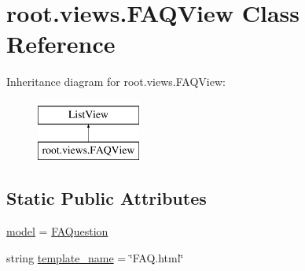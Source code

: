 \hypertarget{classroot_1_1views_1_1_f_a_q_view}{\section{root.\-views.\-F\-A\-Q\-View Class Reference}
\label{classroot_1_1views_1_1_f_a_q_view}
}
Inheritance diagram for root.\-views.\-F\-A\-Q\-View\-:\begin{figure}[H]
\begin{center}
\leavevmode
\includegraphics[height=2.000000cm]{classroot_1_1views_1_1_f_a_q_view}
\end{center}
\end{figure}
\subsection*{Static Public Attributes}
\begin{DoxyCompactItemize}
\item 
\hyperlink{classroot_1_1views_1_1_f_a_q_view_aa7ccddd0da9cc4dbd9d68923cb8f6a73}{model} = \hyperlink{classqueries_1_1models_1_1_f_a_question}{F\-A\-Question}
\item 
string \hyperlink{classroot_1_1views_1_1_f_a_q_view_a342d1013351cfcbd46cbfd65cefa9e8d}{template\-\_\-name} = \char`\"{}F\-A\-Q.\-html\char`\"{}
\end{DoxyCompactItemize}


